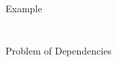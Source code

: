 \documentclass[notes xcolor=dvipsnames]{beamer}
\begin{document}
\begin{frame}{Example}
\begin{columns}
\begin{column}{0.5\textwidth}
                \begin{figure}
                \end{figure}
                
            \end{column}


        \end{columns}
        
        

    \end{frame}

    \begin{frame}{Problem of Dependencies}


        \begin{figure}
        \end{figure}

        \begin{figure}
        \end{figure}
        
    \end{frame}

   
\end{document}
